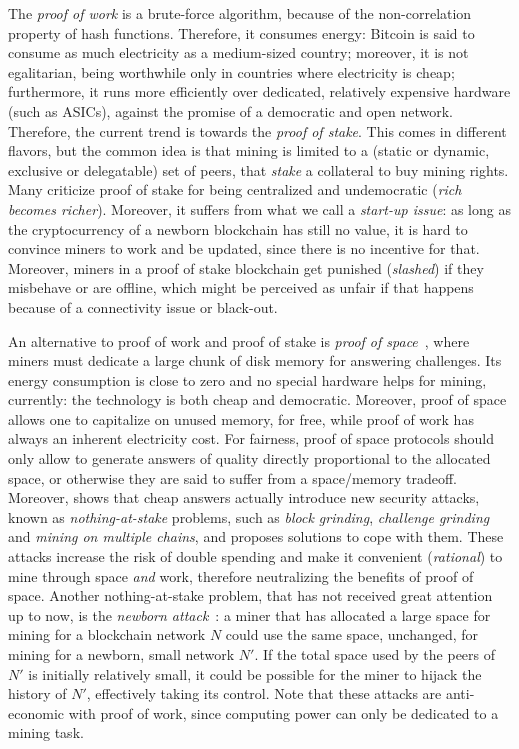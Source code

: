 The \emph{proof of work} is a brute-force algorithm,
because of the non-correlation property of hash functions.
Therefore, it consumes energy: Bitcoin is said to consume as much electricity as
a medium-sized country; moreover, it is not egalitarian, being
worthwhile only in countries where electricity is cheap; furthermore, it
runs more efficiently over dedicated, relatively expensive hardware (such as ASICs),
against the promise of a democratic and open network.
Therefore, the current trend is towards the \emph{proof of stake}.
This comes in different flavors, but
the common idea is that mining is limited to a (static or dynamic, exclusive or delegatable)
set of peers, that \emph{stake} a collateral to buy mining rights.
Many criticize proof of stake for being centralized and undemocratic
(\emph{rich becomes richer}).
Moreover, it suffers from what we call a \emph{start-up issue}: as long as the cryptocurrency
of a newborn blockchain has still no value, it is hard to convince miners to work and
be updated, since there is no incentive for that. Moreover, miners in
a proof of stake blockchain get punished (\emph{slashed}) if they misbehave or are offline, which
might be perceived as unfair if that happens because of a connectivity issue or black-out.

An alternative to proof of work and proof of stake is
\emph{proof of space}~\cite{AtenieseBFG14,DziembowskiFKP15}, where
miners must dedicate a large chunk of disk memory for answering challenges.
Its energy consumption is close to zero and no special
hardware helps for mining, currently: the technology is both cheap
and democratic. Moreover, proof of space allows
one to capitalize on unused memory, for free, while proof of work has always an
inherent electricity cost.
For fairness, proof of space protocols should only allow to generate answers of
quality directly proportional to the allocated space, or otherwise they are said
to suffer from a space/memory tradeoff.
Moreover, \cite{ParkKFGAP18} shows that
cheap answers actually introduce new security attacks,
known as \emph{nothing-at-stake} problems, such as \emph{block grinding},
\emph{challenge grinding} and \emph{mining on multiple chains},
and proposes solutions to cope with them.
These attacks increase the risk of double spending and make it convenient
(\emph{rational}) to mine through space \emph{and} work, therefore neutralizing the benefits
of proof of space.
Another nothing-at-stake problem, that has not received great attention up to now,
is the \emph{newborn attack}~\cite{TangZDWLG0L19}: a miner that has allocated a large space
for mining for a blockchain network $N$ could use the same space, unchanged, for
mining for a newborn, small network $N'$. If the total space used by the peers of $N'$ is
initially relatively small, it could be possible for the miner to hijack the history of $N'$,
effectively taking its control. Note that these attacks are anti-economic with proof of work,
since computing power can only be dedicated to a mining task.

